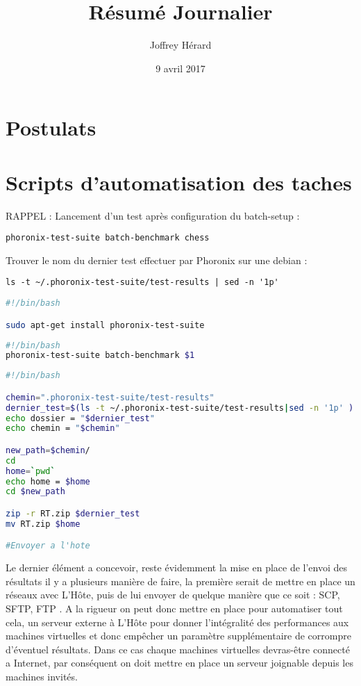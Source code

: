 \documentclass[french]{article}
\begin{document}
\title{Résumé Journalier}
\author{Joffrey Hérard}
\date{9 avril 2017} 

\maketitle

\section{Postulats}

\section{Scripts d'automatisation des taches}
RAPPEL : 
Lancement d'un test après configuration du batch-setup :

\begin{verbatim}
phoronix-test-suite batch-benchmark chess
\end{verbatim}

Trouver le nom du dernier test effectuer par Phoronix sur une debian : 
\begin{verbatim}
ls -t ~/.phoronix-test-suite/test-results | sed -n '1p'
\end{verbatim}



\begin{lstlisting}[language=bash,caption={install.sh},frame=single]
#!/bin/bash

sudo apt-get install phoronix-test-suite
\end{lstlisting}


\begin{lstlisting}[language=bash,caption={launchJob.sh},frame=single]
#!/bin/bash
phoronix-test-suite batch-benchmark $1
\end{lstlisting}
\newpage
\begin{lstlisting}[language=bash,caption={packResult.sh},frame=single]
#!/bin/bash

chemin=".phoronix-test-suite/test-results"
dernier_test=$(ls -t ~/.phoronix-test-suite/test-results|sed -n '1p' )
echo dossier = "$dernier_test"
echo chemin = "$chemin"

new_path=$chemin/
cd 
home=`pwd`
echo home = $home
cd $new_path

zip -r RT.zip $dernier_test
mv RT.zip $home

#Envoyer a l'hote
\end{lstlisting}

Le dernier élément a concevoir, reste évidemment la mise en place de l'envoi des résultats il y a plusieurs manière de faire, la première serait de mettre en place un réseaux avec L’Hôte, puis de lui envoyer de quelque manière que ce soit : \newline
SCP, SFTP, FTP .
A la rigueur on peut donc mettre en place pour automatiser tout cela, un serveur externe à L’Hôte pour donner l'intégralité des performances aux machines virtuelles et donc empêcher un paramètre supplémentaire de corrompre d’éventuel résultats. Dans ce cas chaque machines virtuelles devras-être connecté a Internet, par conséquent on doit mettre en place un serveur joignable depuis les machines invités.
\end{document}
